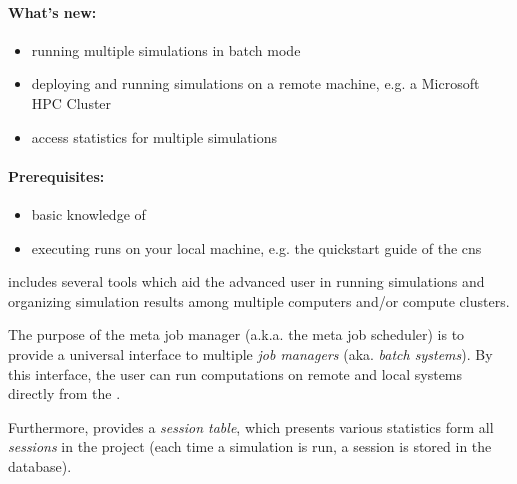 
\graphicspath{{MetaJobManager/MetaJobManager.texbatch/}}

\paragraph{What's new:} 
\begin{itemize}
	\item running multiple simulations in batch mode
	\item deploying and running simulations on a remote machine, e.g. a Microsoft HPC Cluster
	\item access statistics for multiple simulations
\end{itemize}

\paragraph{Prerequisites:} 
\begin{itemize}
	\item basic knowledge of \BoSSSpad{}
	\item executing runs on your local machine, e.g. the quickstart guide of the \ac{cns}
\end{itemize}

\BoSSS  includes several tools which aid the advanced user in running simulations and organizing simulation results among multiple computers and/or compute clusters.


The purpose of the meta job manager (a.k.a. the meta job scheduler)
is to provide a universal interface to multiple \emph{job managers} (aka. \emph{batch systems}).
By this interface, the user can run computations on remote and local systems directly from the \BoSSSpad{}.

Furthermore, \BoSSSpad{}  provides a \emph{session table},
which presents various statistics form all \emph{sessions} in the project
(each time a simulation is run, a session is stored in the \BoSSS database).

